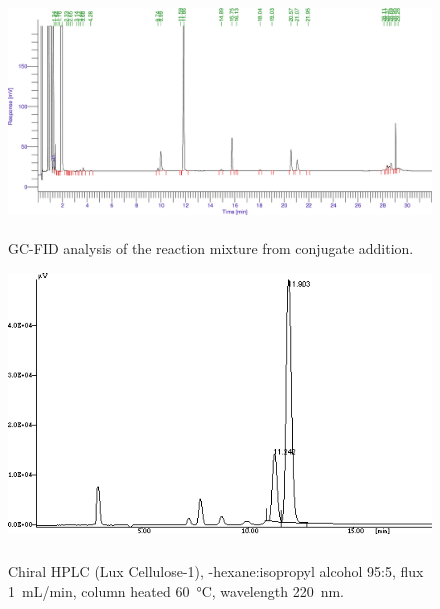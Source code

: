 \else
\fignoeps
\fi


\ifpdf
\begin{figure}%
 \centering
 \includegraphics[width=1\textwidth]{sp/gc-indicizzato16.png}
  \caption{\\GC-FID analysis of the reaction mixture from conjugate addition.\label{sp:gc}}
\end{figure}
\begin{figure}%
 \centering
 \includegraphics[width=1\textwidth]{sp/hplc.png}
  \caption{\\Chiral HPLC (Lux\textsuperscript{\textregistered} Cellulose-1), \n-hexane:isopropyl alcohol 95:5, flux 1~mL/min, column heated \SI{60}{\celsius}, wavelength 220~nm.\label{sp:hplc}}
\end{figure}
\else
\fignoeps
\fi




